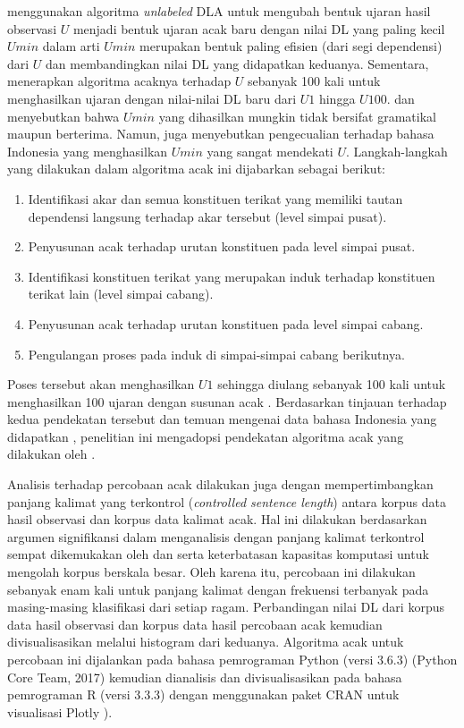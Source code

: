\cite{gildea2010grammars} menggunakan algoritma \textit{unlabeled} DLA untuk mengubah bentuk ujaran hasil observasi $U$ menjadi bentuk ujaran acak baru dengan nilai DL yang paling kecil $Umin$ dalam arti $Umin$ merupakan bentuk paling efisien (dari segi dependensi) dari $U$ dan membandingkan nilai DL yang didapatkan keduanya. Sementara, \cite{futrell2015large} menerapkan algoritma acaknya terhadap $U$ sebanyak 100 kali untuk menghasilkan ujaran dengan nilai-nilai DL baru dari $U1$ hingga $U100$. \cite{futrell2015large} dan \cite{gildea2010grammars}menyebutkan bahwa $Umin$ yang dihasilkan mungkin tidak bersifat gramatikal maupun berterima. Namun, \cite{futrell2015large} juga menyebutkan pengecualian terhadap bahasa Indonesia yang menghasilkan $Umin$ yang sangat mendekati $U$. Langkah-langkah yang dilakukan dalam algoritma acak ini dijabarkan sebagai berikut:
\begin{enumerate}
\item Identifikasi akar dan semua konstituen terikat yang memiliki tautan dependensi langsung terhadap akar tersebut (level simpai pusat).
\item Penyusunan acak terhadap urutan konstituen pada level simpai pusat.
\item Identifikasi konstituen terikat yang merupakan induk terhadap konstituen terikat lain (level simpai cabang).
\item Penyusunan acak terhadap urutan konstituen pada level simpai cabang.
\item Pengulangan proses pada induk di simpai-simpai cabang berikutnya.
\end{enumerate}
Poses tersebut akan menghasilkan $U1$ sehingga diulang sebanyak 100 kali untuk menghasilkan 100 ujaran dengan susunan acak \citep{futrell2015large}. Berdasarkan tinjauan terhadap kedua pendekatan tersebut dan temuan mengenai data bahasa Indonesia yang didapatkan \cite{futrell2015large}, penelitian ini mengadopsi pendekatan algoritma acak yang dilakukan oleh \cite{futrell2015large}.

Analisis terhadap percobaan acak dilakukan juga dengan mempertimbangkan panjang kalimat yang terkontrol (\textit{controlled sentence length}) antara korpus data hasil observasi dan korpus data kalimat acak. Hal ini dilakukan berdasarkan argumen signifikansi dalam menganalisis dengan panjang kalimat terkontrol sempat dikemukakan oleh \cite{ferrer2014risks} dan \cite{jiang2015effects} serta keterbatasan kapasitas komputasi untuk mengolah korpus berskala besar. Oleh karena itu, percobaan ini dilakukan sebanyak enam kali untuk panjang kalimat dengan frekuensi terbanyak pada masing-masing klasifikasi dari setiap ragam. Perbandingan nilai DL dari korpus data hasil observasi dan korpus data hasil percobaan acak kemudian divisualisasikan melalui histogram dari keduanya. Algoritma acak untuk percobaan ini dijalankan pada bahasa pemrograman Python (versi 3.6.3) (Python Core Team, 2017) kemudian dianalisis dan divisualisasikan pada bahasa pemrograman R (versi 3.3.3) \citep{r2017project} dengan menggunakan paket CRAN untuk visualisasi Plotly \citep{sievert2017plotly}).

